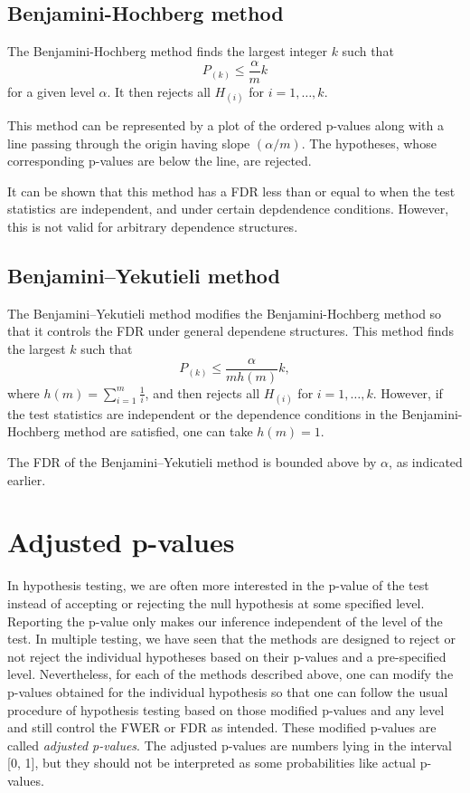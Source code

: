 \documentclass[
]{book}
\begin{document}
\hypertarget{BH}{%
\subsection{Benjamini-Hochberg method}\label{BH}}

The Benjamini-Hochberg method \citep{benjamini1995controlling} finds the largest integer \(k\) such that \[P_{(k)} \le \frac{\alpha}{m} k\] for a given level \(\alpha\). It then rejects all \(H_{(i)}\) for \(i = 1, \ldots, k\).

This method can be represented by a plot of the ordered p-values along with a line passing through the origin having slope \((\alpha / m)\). The hypotheses, whose corresponding p-values are below the line, are rejected.

It can be shown that this method has a FDR less than or equal to \alpha when the test statistics are independent, and under certain depdendence conditions. However, this is not valid for arbitrary dependence structures.

\hypertarget{BY}{%
\subsection{Benjamini--Yekutieli method}\label{BY}}

The Benjamini--Yekutieli method \citep{benjamini2001control} modifies the Benjamini-Hochberg method so that it controls the FDR under general dependene structures. This method finds the largest \(k\) such that \[P_{(k)} \le \frac{\alpha}{m h(m)} k ,\] where \(h(m) = \sum_{i=1}^m \frac{1}{i}\), and then rejects all \(H_{(i)}\) for \(i = 1, \ldots, k\). However, if the test statistics are independent or the dependence conditions in the Benjamini-Hochberg method are satisfied, one can take \(h(m) = 1\).

The FDR of the Benjamini--Yekutieli method is bounded above by \(\alpha\), as indicated earlier.

\hypertarget{adjusted-pvalues}{%
\section{Adjusted p-values}\label{adjusted-pvalues}}

In hypothesis testing, we are often more interested in the p-value of the test instead of accepting or rejecting the null hypothesis at some specified level. Reporting the p-value only makes our inference independent of the level of the test. In multiple testing, we have seen that the methods are designed to reject or not reject the individual hypotheses based on their p-values and a pre-specified level. Nevertheless, for each of the methods described above, one can modify the p-values obtained for the individual hypothesis so that one can follow the usual procedure of hypothesis testing based on those modified p-values and any level and still control the FWER or FDR as intended. These modified p-values are called \emph{adjusted p-values}. The adjusted p-values are numbers lying in the interval {[}0, 1{]}, but they should not be interpreted as some probabilities like actual p-values.
\end{document}

